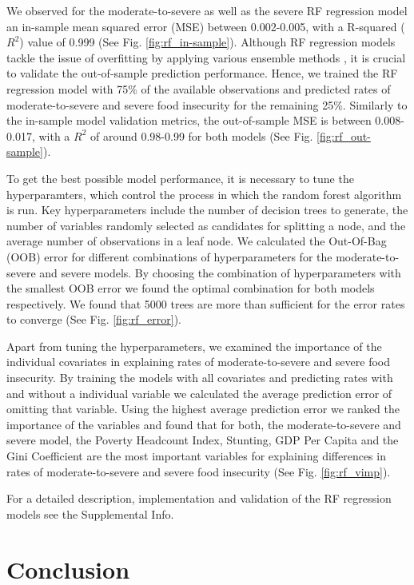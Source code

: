 \documentclass{article}
\begin{document}
We observed for the moderate-to-severe as well as the severe RF regression model an in-sample mean squared error (MSE) between 0.002-0.005, with a R-squared (${R}^2$) value of 0.999 (See Fig. \ref{fig:rf_in-sample}). Although RF regression models tackle the issue of overfitting by applying various ensemble methods \citep{breiman2001random}, it is crucial to validate the out-of-sample prediction performance. Hence, we trained the RF regression model with 75\% of the available observations and predicted rates of moderate-to-severe and severe food insecurity for the remaining 25\%. Similarly to the in-sample model validation metrics, the out-of-sample MSE is between 0.008-0.017, with a ${R}^2$ of around 0.98-0.99 for both models (See Fig. \ref{fig:rf_out-sample}).

To get the best possible model performance, it is necessary to tune the hyperparamters, which control the process in which the random forest algorithm is run.  Key hyperparameters include the number of decision trees to generate, the number of variables randomly selected as candidates for splitting a node, and the average number of observations in a leaf node.  We calculated the Out-Of-Bag (OOB) error for different combinations of hyperparameters for the moderate-to-severe and severe models. By choosing the combination of hyperparameters with the smallest OOB error we found the optimal combination for both models respectively. We found that 5000 trees are more than sufficient for the error rates to converge (See Fig. \ref{fig:rf_error}).

Apart from tuning the hyperparameters, we examined the importance of the individual covariates in explaining rates of moderate-to-severe and severe food insecurity. By training the models with all covariates and predicting rates with and without a individual variable we calculated the average prediction error of omitting that variable. Using the highest average prediction error we ranked the importance of the variables and found that for both, the moderate-to-severe and severe model, the Poverty Headcount Index, Stunting, GDP Per Capita and the Gini Coefficient are the most important variables for explaining differences in rates of moderate-to-severe and severe food insecurity (See Fig. \ref{fig:rf_vimp}).

For a detailed description, implementation and validation of the RF regression models see the Supplemental Info.

\section{Conclusion}
\end{document}
